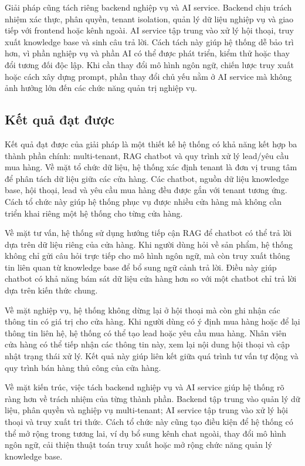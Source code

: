 \documentclass[../DoAn.tex]{subfiles}
\begin{document}
Giải pháp cũng tách riêng backend nghiệp vụ và AI service. Backend chịu trách nhiệm xác thực, phân quyền, tenant isolation, quản lý dữ liệu nghiệp vụ và giao tiếp với frontend hoặc kênh ngoài. AI service tập trung vào xử lý hội thoại, truy xuất knowledge base và sinh câu trả lời. Cách tách này giúp hệ thống dễ bảo trì hơn, vì phần nghiệp vụ và phần AI có thể được phát triển, kiểm thử hoặc thay đổi tương đối độc lập. Khi cần thay đổi mô hình ngôn ngữ, chiến lược truy xuất hoặc cách xây dựng prompt, phần thay đổi chủ yếu nằm ở AI service mà không ảnh hưởng lớn đến các chức năng quản trị nghiệp vụ.

\subsection{Kết quả đạt được}
\label{subsection:5.1.3}

Kết quả đạt được của giải pháp là một thiết kế hệ thống có khả năng kết hợp ba thành phần chính: multi-tenant, RAG chatbot và quy trình xử lý lead/yêu cầu mua hàng. Về mặt tổ chức dữ liệu, hệ thống xác định tenant là đơn vị trung tâm để phân tách dữ liệu giữa các cửa hàng. Các chatbot, nguồn dữ liệu knowledge base, hội thoại, lead và yêu cầu mua hàng đều được gắn với tenant tương ứng. Cách tổ chức này giúp hệ thống phục vụ được nhiều cửa hàng mà không cần triển khai riêng một hệ thống cho từng cửa hàng.

Về mặt tư vấn, hệ thống sử dụng hướng tiếp cận RAG để chatbot có thể trả lời dựa trên dữ liệu riêng của cửa hàng. Khi người dùng hỏi về sản phẩm, hệ thống không chỉ gửi câu hỏi trực tiếp cho mô hình ngôn ngữ, mà còn truy xuất thông tin liên quan từ knowledge base để bổ sung ngữ cảnh trả lời. Điều này giúp chatbot có khả năng bám sát dữ liệu cửa hàng hơn so với một chatbot chỉ trả lời dựa trên kiến thức chung.

Về mặt nghiệp vụ, hệ thống không dừng lại ở hội thoại mà còn ghi nhận các thông tin có giá trị cho cửa hàng. Khi người dùng có ý định mua hàng hoặc để lại thông tin liên hệ, hệ thống có thể tạo lead hoặc yêu cầu mua hàng. Nhân viên cửa hàng có thể tiếp nhận các thông tin này, xem lại nội dung hội thoại và cập nhật trạng thái xử lý. Kết quả này giúp liên kết giữa quá trình tư vấn tự động và quy trình bán hàng thủ công của cửa hàng.

Về mặt kiến trúc, việc tách backend nghiệp vụ và AI service giúp hệ thống rõ ràng hơn về trách nhiệm của từng thành phần. Backend tập trung vào quản lý dữ liệu, phân quyền và nghiệp vụ multi-tenant; AI service tập trung vào xử lý hội thoại và truy xuất tri thức. Cách tổ chức này cũng tạo điều kiện để hệ thống có thể mở rộng trong tương lai, ví dụ bổ sung kênh chat ngoài, thay đổi mô hình ngôn ngữ, cải thiện thuật toán truy xuất hoặc mở rộng chức năng quản lý knowledge base.
\end{document}
